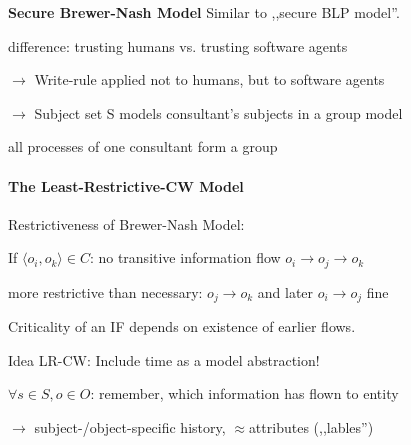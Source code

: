 \documentclass[a4paper]{article}
\renewcommand{\note}[2]{\begin{noteBox} \textbf{#1} #2 \end{noteBox}}
\begin{document}
\begin{multicols}{3}
    \note{Secure Brewer-Nash Model}{Similar to ,,secure BLP model''.}
    \begin{itemize*}
        \item difference: trusting humans vs. trusting software agents
        \item[$\rightarrow$] Write-rule applied not to humans, but to software agents
        \item[$\rightarrow$] Subject set S models consultant’s subjects in a group model
        \begin{itemize*}
            \item all processes of one consultant form a group
        \end{itemize*}
    \end{itemize*}

    \paragraph{The Least-Restrictive-CW Model}

    Restrictiveness of Brewer-Nash Model:
    \begin{itemize*}
        \item If $\langle o_i,o_k\rangle \in C$: no transitive information flow $o_i \rightarrow o_j\rightarrow o_k$
        \item more restrictive than necessary: $o_j\rightarrow o_k$ and later $o_i\rightarrow o_j$ fine
        \item Criticality of an IF depends on existence of earlier flows.
    \end{itemize*}

    Idea LR-CW: Include time as a model abstraction!
    \begin{itemize*}
        \item $\forall s\in S,o\in O$: remember, which information has flown to entity
        \item[$\rightarrow$] subject-/object-specific history, $\approx$attributes (,,lables'')
    \end{itemize*}


\end{multicols}
\end{document}
